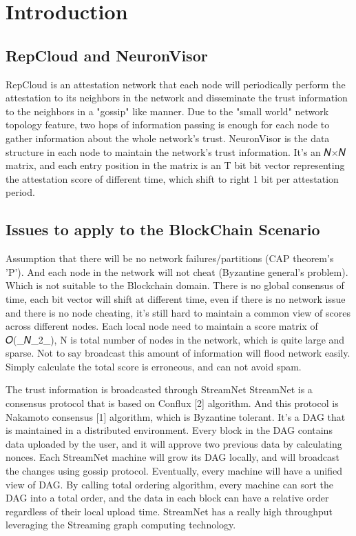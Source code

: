 \section{Introduction}

\subsection{RepCloud and NeuronVisor}
RepCloud is an attestation network that each node will periodically perform the attestation to its neighbors in the network and disseminate the trust information to the neighbors in a "gossip" like manner. 
Due to the "small world" network topology feature, two hops of information passing is enough for each node to gather information about the whole network's trust. 
NeuronVisor is the data structure in each node to maintain the network's trust information. It's an 𝑁×𝑁 matrix, and each entry position in the matrix is an T bit bit vector representing the attestation score of different time, which shift to right 1 bit per attestation period.

\subsection{Issues to apply to the BlockChain Scenario}
Assumption that there will be no network failures/partitions (CAP theorem's 'P'). And each node in the network will not cheat (Byzantine general's problem). Which is not suitable to the Blockchain domain.
There is no global consensus of time, each bit vector will shift at different time, even if there is no network issue and there is no node cheating, it's still hard to maintain a common view of scores across different nodes.
Each local node need to maintain a score matrix of 𝑂(_𝑁_2_), N is total number of nodes in the network, which is quite large and sparse. Not to say broadcast this amount of information will flood network easily.
Simply calculate the total score is erroneous, and can not avoid spam.


The trust information is broadcasted through StreamNet
StreamNet is a consensus protocol that is based on Conflux [2] algorithm. And this protocol is Nakamoto consensus [1] algorithm, which is Byzantine tolerant.
It's a DAG that is maintained in a distributed environment. Every block in the DAG contains data uploaded by the user, and it will approve two previous data by calculating nonces.
Each StreamNet machine will grow its DAG locally, and will broadcast the changes using gossip protocol. Eventually, every machine will have a unified view of DAG.
By calling total ordering algorithm, every machine can sort the DAG into a total order, and the data in each block can have a relative order regardless of their local upload time. 
StreamNet has a really high throughput leveraging the Streaming graph computing technology.


